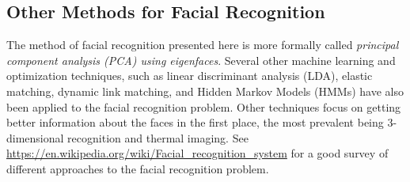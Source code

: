 \subsection*{Other Methods for Facial Recognition} %

The method of facial recognition presented here is more formally called \emph{principal component analysis (PCA) using eigenfaces}.
Several other machine learning and optimization techniques, such as linear discriminant analysis (LDA), elastic matching, dynamic link matching, and Hidden Markov Models (HMMs) have also been applied to the facial recognition problem.
Other techniques focus on getting better information about the faces in the first place, the most prevalent being 3-dimensional recognition and thermal imaging.
See \url{https://en.wikipedia.org/wiki/Facial_recognition_system} for a good survey of different approaches to the facial recognition problem.

